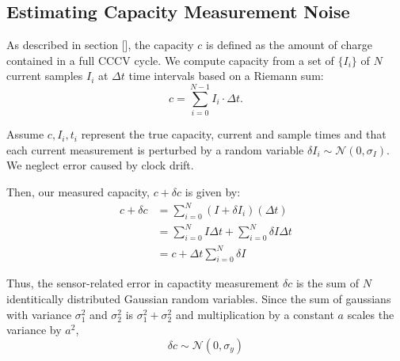 \documentclass[conference]{IEEEtran}
\newcommand{\normal}{\mathcal{N}}
\begin{document}



\subsection{Estimating Capacity Measurement Noise}
As described in section [], the capacity $c$ is defined as the 
amount of charge contained in a full CCCV cycle. We compute capacity
from a set of $\{I_i\}$ of $N$ current samples $I_i$ at $\Delta t$
time intervals based on a Riemann sum:
\begin{equation*}
    c = \sum_{i=0}^{N-1} I_i \cdot \Delta t.
\end{equation*}

Assume $c,I_i,t_i$ represent the true capacity, current and sample times
and that each current measurement is perturbed by a random variable
$\delta I_i\sim \normal(0, \sigma_I)$. We neglect error caused
by clock drift.

Then, our measured capacity, $c + \delta c$
is given by:
\begin{align*}
    c + \delta c &= \sum_{i=0}^{N} (I + \delta I_i) (\Delta t) \\
        &= \sum_{i=0}^{N} I \Delta t + \sum_{i=0}^{N} \delta I \Delta t \\
        &= c + \Delta t \sum_{i=0}^{N} \delta I 
\end{align*}

Thus, the sensor-related error in capactity measurement $\delta c$ is 
the sum of $N$ identitically distributed Gaussian random variables.
Since the sum of gaussians with variance $\sigma_1^2$ and $\sigma_2^2$
is $\sigma_1^2 + \sigma_2^2$ and multiplication by a constant $a$
scales the variance by $a^2$, 
\begin{equation*}
    \delta c \sim \normal(0, \sigma_y)
\end{equation*}
\end{document}
